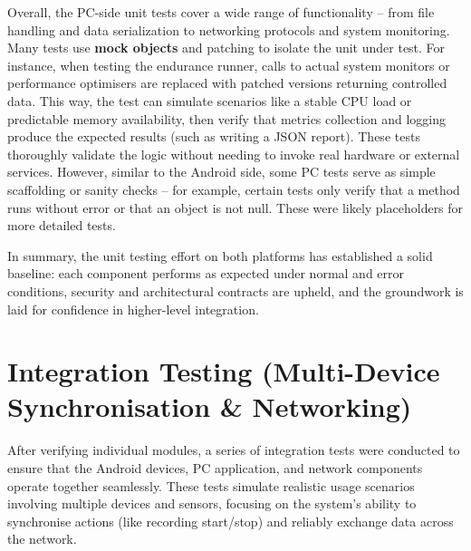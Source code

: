 Overall, the PC-side unit tests cover a wide range of functionality -- from file handling and data serialization to networking protocols and system monitoring. Many tests use \textbf{mock objects} and patching to isolate the unit under test. For instance, when testing the endurance runner, calls to actual system monitors or performance optimisers are replaced with patched versions returning controlled data. This way, the test can simulate scenarios like a stable CPU load or predictable memory availability, then verify that metrics collection and logging produce the expected results (such as writing a JSON report). These tests thoroughly validate the logic without needing to invoke real hardware or external services. However, similar to the Android side, some PC tests serve as simple scaffolding or sanity checks -- for example, certain tests only verify that a method runs without error or that an object is not null. These were likely placeholders for more detailed tests.

In summary, the unit testing effort on both platforms has established a solid baseline: each component performs as expected under normal and error conditions, security and architectural contracts are upheld, and the groundwork is laid for confidence in higher-level integration.

\section{Integration Testing (Multi-Device Synchronisation \& Networking)}
After verifying individual modules, a series of integration tests were conducted to ensure that the Android devices, PC application, and network components operate together seamlessly. These tests simulate realistic usage scenarios involving multiple devices and sensors, focusing on the system's ability to synchronise actions (like recording start/stop) and reliably exchange data across the network.

